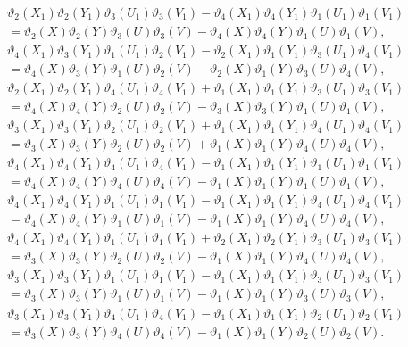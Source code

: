 \documentclass[10pt,a4paper]{amsart}
\begin{document}
\begin{align}
&\vartheta_2(X_1)\vartheta_2(Y_1)\vartheta_3(U_1)\vartheta_3(V_1)-\vartheta_4(X_1)\vartheta_4(Y_1)\vartheta_1(U_1)\vartheta_1(V_1)\label{pr4-1}\\
&=\vartheta_2(X)\vartheta_2(Y)\vartheta_3(U)\vartheta_3(V)-\vartheta_4(X)\vartheta_4(Y)\vartheta_1(U)\vartheta_1(V),\nonumber\\
&\vartheta_4(X_1)\vartheta_3(Y_1)\vartheta_1(U_1)\vartheta_2(V_1)-\vartheta_2(X_1)\vartheta_1(Y_1)\vartheta_3(U_1)\vartheta_4(V_1)\label{pr4-2}\\
&=\vartheta_4(X)\vartheta_3(Y)\vartheta_1(U)\vartheta_2(V)-\vartheta_2(X)\vartheta_1(Y)\vartheta_3(U)\vartheta_4(V),\nonumber\\
&\vartheta_2(X_1)\vartheta_2(Y_1)\vartheta_4(U_1)\vartheta_4(V_1)+\vartheta_1(X_1)\vartheta_1(Y_1)\vartheta_3(U_1)\vartheta_3(V_1)\label{pr4-3}\\
&=\vartheta_4(X)\vartheta_4(Y)\vartheta_2(U)\vartheta_2(V)-\vartheta_3(X)\vartheta_3(Y)\vartheta_1(U)\vartheta_1(V),\nonumber\\
&\vartheta_3(X_1)\vartheta_3(Y_1)\vartheta_2(U_1)\vartheta_2(V_1)+\vartheta_1(X_1)\vartheta_1(Y_1)\vartheta_4(U_1)\vartheta_4(V_1)\label{pr4-3-1}\\
&=\vartheta_3(X)\vartheta_3(Y)\vartheta_2(U)\vartheta_2(V)+\vartheta_1(X)\vartheta_1(Y)\vartheta_4(U)\vartheta_4(V),\nonumber\\
&\vartheta_4(X_1)\vartheta_4(Y_1)\vartheta_4(U_1)\vartheta_4(V_1)-\vartheta_1(X_1)\vartheta_1(Y_1)\vartheta_1(U_1)\vartheta_1(V_1)\label{pr4-3-2}\\
&=\vartheta_4(X)\vartheta_4(Y)\vartheta_4(U)\vartheta_4(V)-\vartheta_1(X)\vartheta_1(Y)\vartheta_1(U)\vartheta_1(V),\nonumber\\
&\vartheta_4(X_1)\vartheta_4(Y_1)\vartheta_1(U_1)\vartheta_1(V_1)-\vartheta_1(X_1)\vartheta_1(Y_1)\vartheta_4(U_1)\vartheta_4(V_1)\label{pr4-3-3}\\
&=\vartheta_4(X)\vartheta_4(Y)\vartheta_1(U)\vartheta_1(V)-\vartheta_1(X)\vartheta_1(Y)\vartheta_4(U)\vartheta_4(V),\nonumber\\
&\vartheta_4(X_1)\vartheta_4(Y_1)\vartheta_1(U_1)\vartheta_1(V_1)+\vartheta_2(X_1)\vartheta_2(Y_1)\vartheta_3(U_1)\vartheta_3(V_1)\label{pr4-3-4}\\
&=\vartheta_3(X)\vartheta_3(Y)\vartheta_2(U)\vartheta_2(V)-\vartheta_1(X)\vartheta_1(Y)\vartheta_4(U)\vartheta_4(V),\nonumber\\
&\vartheta_3(X_1)\vartheta_3(Y_1)\vartheta_1(U_1)\vartheta_1(V_1)-\vartheta_1(X_1)\vartheta_1(Y_1)\vartheta_3(U_1)\vartheta_3(V_1)\label{pr4-3-6}\\
&=\vartheta_3(X)\vartheta_3(Y)\vartheta_1(U)\vartheta_1(V)-\vartheta_1(X)\vartheta_1(Y)\vartheta_3(U)\vartheta_3(V),\nonumber\\
&\vartheta_3(X_1)\vartheta_3(Y_1)\vartheta_4(U_1)\vartheta_4(V_1)-\vartheta_1(X_1)\vartheta_1(Y_1)\vartheta_2(U_1)\vartheta_2(V_1)\label{pr4-3-7}\\
&=\vartheta_3(X)\vartheta_3(Y)\vartheta_4(U)\vartheta_4(V)-\vartheta_1(X)\vartheta_1(Y)\vartheta_2(U)\vartheta_2(V).\nonumber
\end{align}
\end{document}
